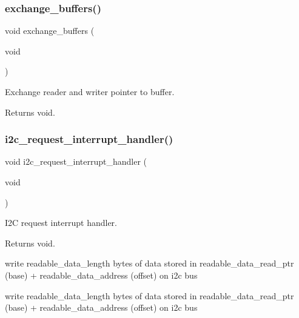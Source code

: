 \subsubsection{\texorpdfstring{exchange\+\_\+buffers()}{exchange\_buffers()}}
{\footnotesize\ttfamily void exchange\+\_\+buffers (\begin{DoxyParamCaption}\item[{void}]{ }\end{DoxyParamCaption})}



Exchange reader and writer pointer to buffer. 

\begin{DoxyReturn}{Returns}
void. 
\end{DoxyReturn}
\mbox{\label{i2c-th_8h_ac1da31566bf05976ecb87372278a1ea8}} 
\subsubsection{\texorpdfstring{i2c\+\_\+request\+\_\+interrupt\+\_\+handler()}{i2c\_request\_interrupt\_handler()}}
{\footnotesize\ttfamily void i2c\+\_\+request\+\_\+interrupt\+\_\+handler (\begin{DoxyParamCaption}\item[{void}]{ }\end{DoxyParamCaption})}



I2C request interrupt handler. 

\begin{DoxyReturn}{Returns}
void. 
\end{DoxyReturn}
write readable\+\_\+data\+\_\+length bytes of data stored in readable\+\_\+data\+\_\+read\+\_\+ptr (base) + readable\+\_\+data\+\_\+address (offset) on i2c bus

write readable\+\_\+data\+\_\+length bytes of data stored in readable\+\_\+data\+\_\+read\+\_\+ptr (base) + readable\+\_\+data\+\_\+address (offset) on i2c bus \mbox{\label{i2c-th_8h_ad438327c9cf783bd9c519ce8b8ef3bfa}} 
